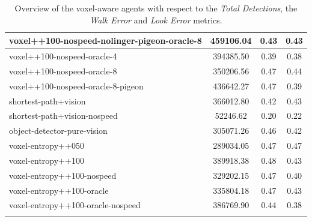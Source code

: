 \begin{longtable}{|l|c|c|c|}
voxel++100-nospeed-nolinger-pigeon-oracle-8 & 459106.04 & {\cellcolor[HTML]{D1E6E1}} \color[HTML]{000000} 0.43 & {\cellcolor[HTML]{D4E7E3}} \color[HTML]{000000} 0.43 \\ \hline
voxel++100-nospeed-oracle-4 & 394385.50 & {\cellcolor[HTML]{BADAD4}} \color[HTML]{000000} 0.39 & {\cellcolor[HTML]{B4D8D0}} \color[HTML]{000000} 0.38 \\ \hline
voxel++100-nospeed-oracle-8 & 350206.56 & {\cellcolor[HTML]{E5EFED}} \color[HTML]{000000} 0.47 & {\cellcolor[HTML]{D8E9E5}} \color[HTML]{000000} 0.44 \\ \hline
voxel++100-nospeed-oracle-8-pigeon & 436642.27 & {\cellcolor[HTML]{E3EFEC}} \color[HTML]{000000} 0.47 & {\cellcolor[HTML]{B6D9D1}} \color[HTML]{000000} 0.39 \\ \hline
shortest-path+vision & 366012.80 & {\cellcolor[HTML]{CCE3DE}} \color[HTML]{000000} 0.42 & {\cellcolor[HTML]{D2E6E2}} \color[HTML]{000000} 0.43 \\ \hline
shortest-path+vision-nospeed & 52246.62 & {\cellcolor[HTML]{55AA99}} \color[HTML]{F1F1F1} 0.20 & {\cellcolor[HTML]{55AA99}} \color[HTML]{F1F1F1} 0.22 \\ \hline
object-detector-pure-vision & 305071.26 & {\cellcolor[HTML]{DEECE9}} \color[HTML]{000000} 0.46 & {\cellcolor[HTML]{C9E2DC}} \color[HTML]{000000} 0.42 \\ \hline
voxel-entropy++050 & 289034.05 & {\cellcolor[HTML]{E3EFEC}} \color[HTML]{000000} 0.47 & {\cellcolor[HTML]{E7F0EE}} \color[HTML]{000000} 0.47 \\ \hline
voxel-entropy++100 & 389918.38 & {\cellcolor[HTML]{EBF2F0}} \color[HTML]{000000} 0.48 & {\cellcolor[HTML]{D4E7E3}} \color[HTML]{000000} 0.43 \\ \hline
voxel-entropy++100-nospeed & 329202.15 & {\cellcolor[HTML]{E5EFED}} \color[HTML]{000000} 0.47 & {\cellcolor[HTML]{C1DED8}} \color[HTML]{000000} 0.40 \\ \hline
voxel-entropy++100-oracle & 335804.18 & {\cellcolor[HTML]{E3EFEC}} \color[HTML]{000000} 0.47 & {\cellcolor[HTML]{D1E6E1}} \color[HTML]{000000} 0.43 \\ \hline
voxel-entropy++100-oracle-nospeed & 386769.90 & {\cellcolor[HTML]{D5E8E4}} \color[HTML]{000000} 0.44 & {\cellcolor[HTML]{B6D8D1}} \color[HTML]{000000} 0.38 \\ \hline

    \caption{Overview of the voxel-aware agents with respect to the \textit{Total Detections}, the \textit{Walk Error} and \textit{Look Error} metrics.}
    \label{tab:results-RQ1-walkLook}
\end{longtable}

